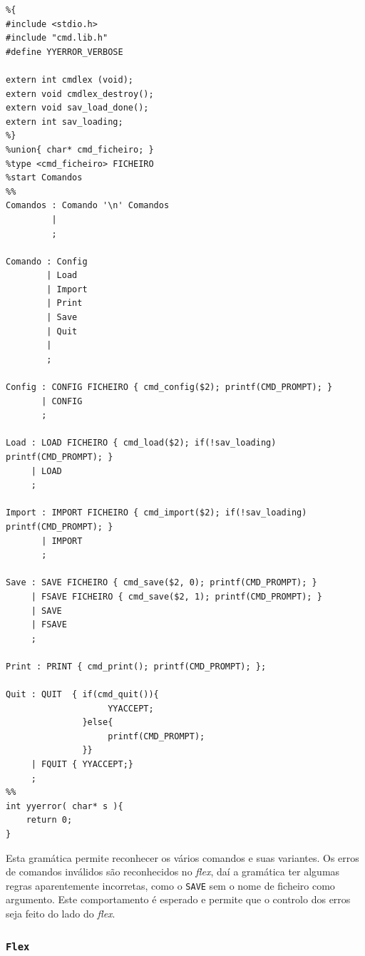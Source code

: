 \documentclass[11pt, a4paper, oneside]{article}
\begin{document}
\begin{lstlisting}[language={}, caption={Yacc do módulo de comandos.}]
%token CONFIG LOAD IMPORT PRINT SAVE FSAVE QUIT FQUIT FICHEIRO
%{
#include <stdio.h>
#include "cmd.lib.h"
#define YYERROR_VERBOSE

extern int cmdlex (void);
extern void cmdlex_destroy();
extern void sav_load_done();
extern int sav_loading;
%}
%union{ char* cmd_ficheiro; }
%type <cmd_ficheiro> FICHEIRO
%start Comandos
%%
Comandos : Comando '\n' Comandos
         | 
         ;

Comando : Config
        | Load
        | Import
        | Print
        | Save
        | Quit
        | 
        ;

Config : CONFIG FICHEIRO { cmd_config($2); printf(CMD_PROMPT); }
       | CONFIG
       ;

Load : LOAD FICHEIRO { cmd_load($2); if(!sav_loading) printf(CMD_PROMPT); }
     | LOAD
     ;

Import : IMPORT FICHEIRO { cmd_import($2); if(!sav_loading) printf(CMD_PROMPT); }
       | IMPORT
       ;

Save : SAVE FICHEIRO { cmd_save($2, 0); printf(CMD_PROMPT); }
     | FSAVE FICHEIRO { cmd_save($2, 1); printf(CMD_PROMPT); }
     | SAVE
     | FSAVE
     ;

Print : PRINT { cmd_print(); printf(CMD_PROMPT); };

Quit : QUIT  { if(cmd_quit()){
                    YYACCEPT;
               }else{
                    printf(CMD_PROMPT);
               }}
     | FQUIT { YYACCEPT;}
     ;
%%
int yyerror( char* s ){
    return 0;
}
\end{lstlisting} 

Esta gramática permite reconhecer os vários comandos e suas variantes. Os erros de comandos inválidos são reconhecidos no \emph{flex}, daí a gramática ter algumas regras aparentemente incorretas, como o \texttt{SAVE} sem o nome de ficheiro como argumento. Este comportamento é esperado e permite que o controlo dos erros seja feito do lado do \emph{flex}.

\newpage
\subsubsection[Flex]{\texttt{Flex}}
\end{document}
